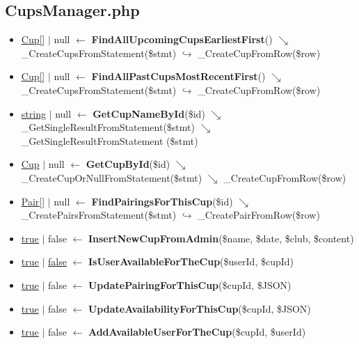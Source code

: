 \subsection{CupsManager.php}
\begin{itemize}
  \setlength\itemsep{0em}
  \item \underline{Cup[]} $\vert$ null $\leftarrow$ \textbf{FindAllUpcomingCupsEarliestFirst}()
  \newline    $\searrow$ \_CreateCupsFromStatement(\$stmt)
  \newline    $\hookrightarrow$ \_CreateCupFromRow(\$row)
  \item \underline{Cup[]} $\vert$ null $\leftarrow$ \textbf{FindAllPastCupsMostRecentFirst}()
  \newline    $\searrow$ \_CreateCupsFromStatement(\$stmt)
  \newline    $\hookrightarrow$ \_CreateCupFromRow(\$row)
  \item \underline{string} $\vert$ null  $\leftarrow$ \textbf{GetCupNameById}(\$id)
  \newline    $\searrow$ \_GetSingleResultFromStatement(\$stmt)
  \newline    $\searrow$ \_GetSingleResultFromStatement (\$stmt)
  \item \underline{Cup} $\vert$ null  $\leftarrow$  \textbf{GetCupById}(\$id)
  \newline    $\searrow$ \_CreateCupOrNullFromStatement(\$stmt)
  \newline    $\searrow$ \_CreateCupFromRow(\$row)
  \item \underline{Pair[]} $\vert$ null $\leftarrow$  \textbf{FindPairingsForThisCup}(\$id)
  \newline    $\searrow$ \_CreatePairsFromStatement(\$stmt)
  \newline    $\hookrightarrow$ \_CreatePairFromRow(\$row)
  \item \underline{true} $\vert$ false $\leftarrow$  \textbf{InsertNewCupFromAdmin}(\$name, \$date, \$club,
  \newline    \$content)
  \item \underline{true} $\vert$ \underline{false} $\leftarrow$  \textbf{IsUserAvailableForTheCup}(\$userId, \$cupId)
  \item \underline{true} $\vert$ false $\leftarrow$  \textbf{UpdatePairingForThisCup}(\$cupId, \$JSON)
  \item \underline{true} $\vert$ false $\leftarrow$  \textbf{UpdateAvailabilityForThisCup}(\$cupId, \$JSON)
  \item \underline{true} $\vert$ false $\leftarrow$  \textbf{AddAvailableUserForTheCup}(\$cupId, \$userId)
\end{itemize}
